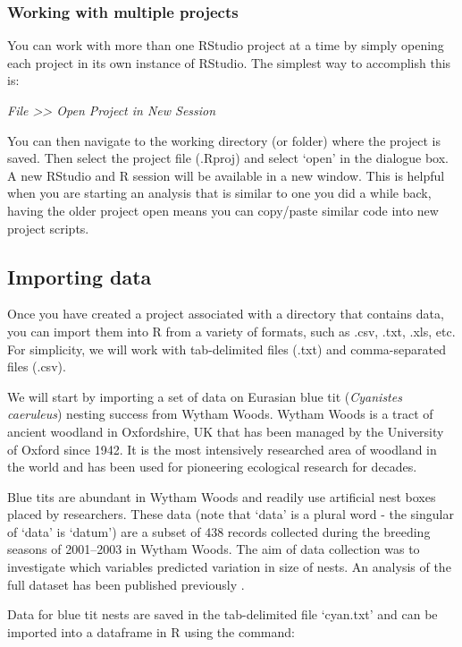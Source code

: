 \documentclass[
]{book}
\begin{document}
\hypertarget{multiproj}{%
\subsubsection{Working with multiple projects}\label{multiproj}}

You can work with more than one RStudio project at a time by simply opening each project in its own instance of RStudio. The simplest way to accomplish this is:

\emph{File \textgreater\textgreater{} Open Project in New Session}

You can then navigate to the working directory (or folder) where the project is saved. Then select the project file (.Rproj) and select `open' in the dialogue box. A new RStudio and R session will be available in a new window. This is helpful when you are starting an analysis that is similar to one you did a while back, having the older project open means you can copy/paste similar code into new project scripts.

\hypertarget{import}{%
\subsection{Importing data}\label{import}}

Once you have created a project associated with a directory that contains data, you can import them into R from a variety of formats, such as .csv, .txt, .xls, etc. For simplicity, we will work with tab-delimited files (.txt) and comma-separated files (.csv).

We will start by importing a set of data on Eurasian blue tit (\emph{Cyanistes caeruleus}) nesting success from Wytham Woods. Wytham Woods is a tract of ancient woodland in Oxfordshire, UK that has been managed by the University of Oxford since 1942. It is the most intensively researched area of woodland in the world and has been used for pioneering ecological research for decades.

Blue tits are abundant in Wytham Woods and readily use artificial nest boxes placed by researchers. These data (note that `data' is a plural word - the singular of `data' is `datum') are a subset of 438 records collected during the breeding seasons of 2001--2003 in Wytham Woods. The aim of data collection was to investigate which variables predicted variation in size of nests. An analysis of the full dataset has been published previously \citep{O_Neill_2018}.

Data for blue tit nests are saved in the tab-delimited file `cyan.txt' and can be imported into a dataframe in R using the command:
\end{document}
